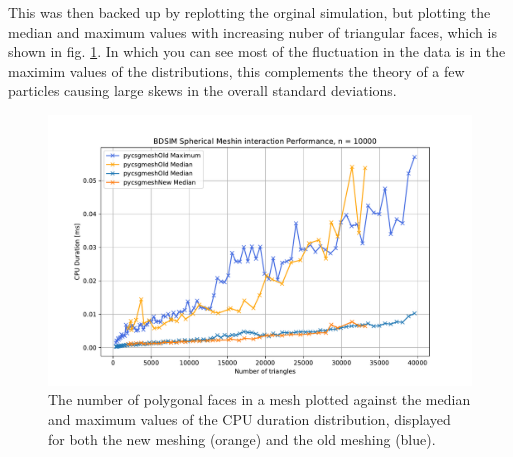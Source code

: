 \documentclass[12pt,a4paper]{article}
\begin{document}
\noindent This was then backed up by replotting the orginal simulation, but plotting the median and maximum values with increasing nuber of triangular faces, which is shown in fig. \ref{mednmax}. In which you can see most of the fluctuation in the data is in the maximim values of the distributions, this complements the theory of a few particles causing large skews in the overall standard deviations.

\begin{figure}[h!]
\centering
\includegraphics[scale=0.6]{Images//CPU//mednmax.pdf}
\caption[width=\columnwidth]{The number of polygonal faces in a mesh plotted against the median and maximum values of the CPU duration distribution, displayed for both the new meshing (orange)  and the old meshing (blue).}
\label{mednmax}
\end{figure}


\newpage
\end{document}
